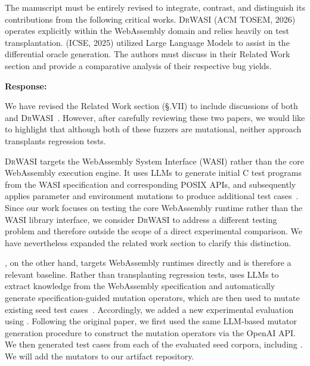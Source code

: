 \documentclass[11pt]{article}
\newenvironment{response}{%
    \par\vspace{10pt}
    \par\noindent\textbf{\color{tseblue}Response:}\par\nobreak\ignorespaces
}{%
    \par\vspace{15pt}
}
\newcounter{reviewernum}
\newcounter{cmtcounter}[reviewernum]
\newenvironment{rcomment}{%
    \stepcounter{cmtcounter}%
    \begin{revcomment}[R\thereviewernum{}.C\thecmtcounter{}.~Reviewer~\thereviewernum{}, Comment~\thecmtcounter]
}{%
    \end{revcomment}
}
\begin{document}
\begin{rcomment}
    The manuscript must be entirely revised to integrate, contrast, and distinguish its contributions from the following critical works. \textsc{DrWASI} (ACM TOSEM, 2026) operates explicitly within the WebAssembly domain and relies heavily on test transplantation. \lwdiff{} (ICSE, 2025) utilized Large Language Models to assist in the differential oracle generation. The authors must discuss \lwdiff{} in their Related Work section and provide a comparative analysis of their respective bug yields.
\end{rcomment}
\begin{response}
    We have revised the Related Work section (§.VII) to include discussions of both \lwdiff{}~\cite{zhou2025lwdiff} and \textsc{DrWASI}~\cite{zhang2025drwasi}. However, after carefully reviewing these two papers, we would like to highlight that although both of these fuzzers are mutational, neither approach transplants regression tests.
    
    \textsc{DrWASI} targets the WebAssembly System Interface (WASI) rather than the core WebAssembly execution engine. It uses LLMs to generate initial C test programs from the WASI specification and corresponding POSIX APIs, and subsequently applies parameter and environment mutations to produce additional test cases~\cite{zhang2025drwasi}. Since our work focuses on testing the core WebAssembly runtime rather than the WASI library interface, we consider \textsc{DrWASI} to address a different testing problem and therefore outside the scope of a direct experimental comparison. We have nevertheless expanded the related work section to clarify this distinction.
    
    \lwdiff{}, on the other hand, targets WebAssembly runtimes directly and is therefore a relevant baseline. Rather than transplanting regression tests, \lwdiff{} uses LLMs to extract knowledge from the WebAssembly specification and automatically generate specification-guided mutation operators, which are then used to mutate existing seed test cases~\cite{zhou2025lwdiff}. Accordingly, we added a new experimental evaluation using \lwdiff{}. Following the original paper, we first used the same LLM-based mutator generation procedure to construct the mutation operators via the OpenAI API. We then generated test cases from each of the evaluated seed corpora, including \rtbench{}. We will add the \lwdiff{} mutators to our artifact repository.
    

\end{response}
\end{document}
